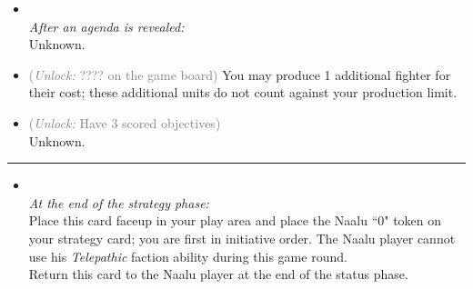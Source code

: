 \begin{multicols}{2}

\begin{itemize}
\item {}\\
\emph{After an agenda is revealed:}\\
Unknown.
\item {} \textcolor{gray}{(\emph{Unlock:} ???? on the game board)} %
You may produce 1 additional fighter for their cost; these additional units do not count against your production limit.
\item {} \textcolor{gray}{(\emph{Unlock:} Have 3 scored objectives)}\\
Unknown.
\end{itemize}

\vspace{-10pt}\rule{\hsize}{0.4pt}\vspace{5pt}


\begin{itemize}
\item {}\\
\emph{At the end of the strategy phase:}\\
Place this card faceup in your play area and place the Naalu ``0" token on your strategy card; you are first in initiative order. The Naalu player cannot use his \emph{Telepathic} faction ability during this game round.\\
Return this card to the Naalu player at the end of the status phase.
\end{itemize}

\end{multicols}



